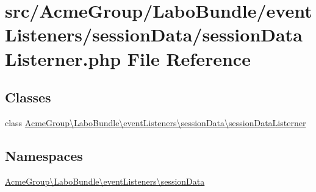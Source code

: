 \hypertarget{session_data_listerner_8php}{\section{src/\+Acme\+Group/\+Labo\+Bundle/event\+Listeners/session\+Data/session\+Data\+Listerner.php File Reference}
\label{session_data_listerner_8php}
}
\subsection*{Classes}
\begin{DoxyCompactItemize}
\item 
class \hyperlink{class_acme_group_1_1_labo_bundle_1_1event_listeners_1_1session_data_1_1session_data_listerner}{Acme\+Group\textbackslash{}\+Labo\+Bundle\textbackslash{}event\+Listeners\textbackslash{}session\+Data\textbackslash{}session\+Data\+Listerner}
\end{DoxyCompactItemize}
\subsection*{Namespaces}
\begin{DoxyCompactItemize}
\item 
 \hyperlink{namespace_acme_group_1_1_labo_bundle_1_1event_listeners_1_1session_data}{Acme\+Group\textbackslash{}\+Labo\+Bundle\textbackslash{}event\+Listeners\textbackslash{}session\+Data}
\end{DoxyCompactItemize}
